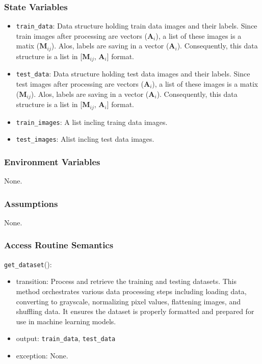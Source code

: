 \documentclass[12pt, titlepage]{article}
\def\code#1{\texttt{#1}}
\begin{document}
\subsubsection{State Variables}
\begin{itemize}
  \item \code{train\_data}: Data structure holding train data images and their labels. 
  Since train images after processing are vectors ($\mathbf{A}_{i}$), a list of these images is 
  a matix ($\mathbf{M}_{ij}$). Alos, labels are saving in a vector ($\mathbf{A}_{i}$). 
  Consequently, this data structure is a list in [$\mathbf{M}_{ij}$, $\mathbf{A}_{i}$] format.
  \item \code{test\_data}: Data structure holding test data images and their labels. 
  Since test images after processing are vectors ($\mathbf{A}_{i}$), a list of these images is 
  a matix ($\mathbf{M}_{ij}$). Alos, labels are saving in a vector ($\mathbf{A}_{i}$). 
  Consequently, this data structure is a list in [$\mathbf{M}_{ij}$, $\mathbf{A}_{i}$] format.
  \item \code{train\_images}: A list incling traing data images.
  \item \code{test\_images}:  Alist incling test data images.
\end{itemize}

\subsubsection{Environment Variables}
None.

\subsubsection{Assumptions}
None.

\subsubsection{Access Routine Semantics}

\noindent \code{get\_dataset}():
\begin{itemize}
  \item transition: Process and retrieve the training and testing datasets.
  This method orchestrates various data processing steps including loading data, 
  converting to grayscale, normalizing pixel values, flattening images, and shuffling data.
  It ensures the dataset is properly formatted and prepared for use in machine learning
  models.
  \item output: \code{train\_data}, \code{test\_data}
  \item exception: None.
\end{itemize}
\end{document}
